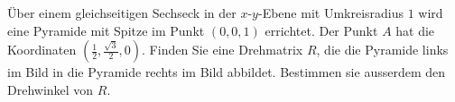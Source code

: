 Über einem gleichseitigen Sechseck in der $x$-$y$-Ebene mit Umkreisradius $1$ 
wird eine Pyramide mit Spitze im Punkt $(0,0,1)$ errichtet.
Der Punkt $A$ hat die Koordinaten $(\frac12,\frac{\sqrt{3}}2,0)$.
Finden Sie eine Drehmatrix $R$, die die Pyramide links im Bild in die
Pyramide rechts im Bild abbildet.
Bestimmen sie ausserdem den Drehwinkel von $R$.

\begin{center}
\end{center}

